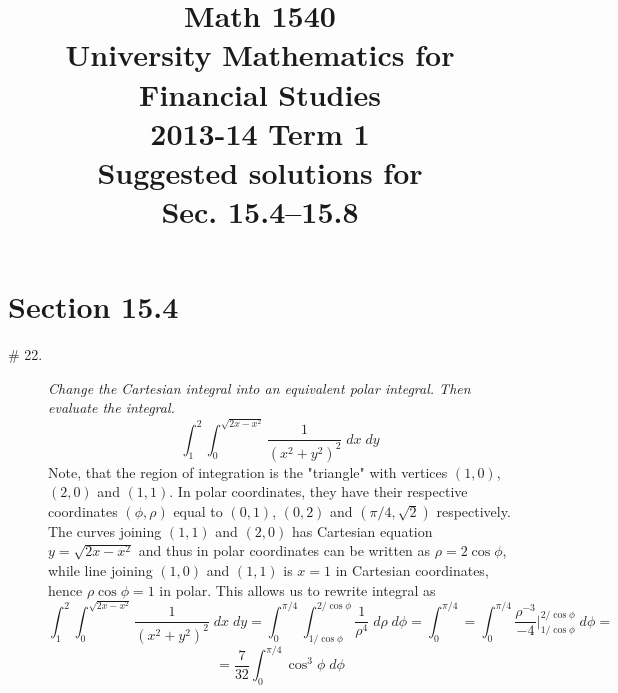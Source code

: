 \documentclass[8pt]{article} %
\title{Math 1540\\University Mathematics for Financial Studies\\2013-14 Term 1\\Suggested solutions for\\
Sec. 15.4--15.8}
\newcommand{\dx}{\;dx}
\newcommand{\dy}{\;dy}
\newcommand{\dr}{\;d\rho}
\newcommand{\dph}{\;d\phi}
\begin{document}
\maketitle
\section{Section 15.4}
\begin{description}
	\item[\# 22.]{{\it Change the Cartesian integral into an equivalent polar integral. Then evaluate the integral.}
		\[\int_1^2\int_0^{\sqrt{2x-x^2}}\frac{1}{(x^2+y^2)^2}\dx\dy\]
		Note, that the region of integration is the "triangle" with vertices $(1,0)$, $(2,0)$ and $(1,1)$. In polar 
		coordinates, they have their respective coordinates $(\phi,\rho)$ equal to $(0,1)$, $(0,2)$ and $(\pi/4,\sqrt{2})$
		respectively. The curves joining $(1,1)$ and $(2,0)$ has Cartesian equation $y=\sqrt{2x-x^2}$ and thus in
		polar coordinates can be written as $\rho=2\cos\phi$, while line joining $(1,0)$ and $(1,1)$ is
		$x=1$ in Cartesian coordinates, hence $\rho\cos\phi=1$ in polar. This allows us to rewrite integral as
		\[\int_1^2\int_0^{\sqrt{2x-x^2}}\frac{1}{(x^2+y^2)^2}\dx\dy=\int_0^{\pi/4}\int_{1/\cos\phi}^{2/\cos\phi}\frac{1}
		{\rho^4}\dr\dph=\int_0^{\pi/4}=\int_0^{\pi/4}\frac{\rho^{-3}}{-4}\bigg|_{1/\cos\phi}^{2/\cos\phi}\dph=\]
		\[=\frac{7}{32}\int_0^{\pi/4}\cos^3\phi\dph\]
		}
\end{description}
\end{document}
